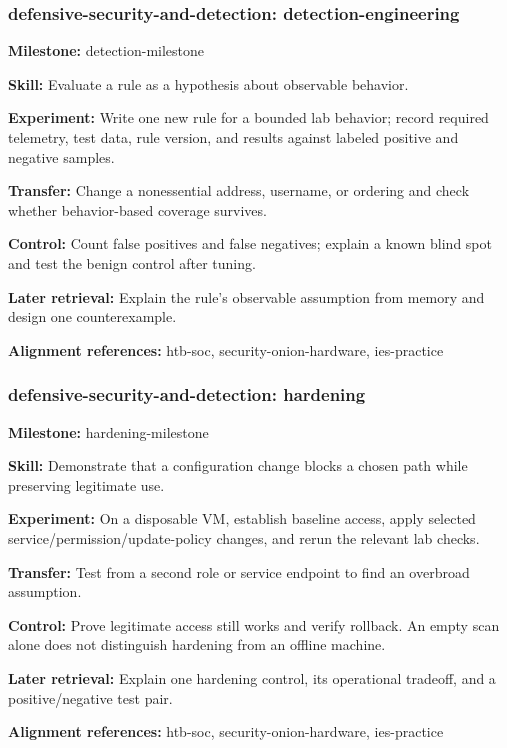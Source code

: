 \subsubsection{defensive-security-and-detection: detection-engineering}
\noindent\textbf{Milestone:} detection-milestone\par
\noindent\textbf{Skill:} Evaluate a rule as a hypothesis about observable behavior.\par
\noindent\textbf{Experiment:} Write one new rule for a bounded lab behavior; record required telemetry, test data, rule version, and results against labeled positive and negative samples.\par
\noindent\textbf{Transfer:} Change a nonessential address, username, or ordering and check whether behavior-based coverage survives.\par
\noindent\textbf{Control:} Count false positives and false negatives; explain a known blind spot and test the benign control after tuning.\par
\noindent\textbf{Later retrieval:} Explain the rule’s observable assumption from memory and design one counterexample.\par
\noindent\textbf{Alignment references:} htb-soc, security-onion-hardware, ies-practice\par
\subsubsection{defensive-security-and-detection: hardening}
\noindent\textbf{Milestone:} hardening-milestone\par
\noindent\textbf{Skill:} Demonstrate that a configuration change blocks a chosen path while preserving legitimate use.\par
\noindent\textbf{Experiment:} On a disposable VM, establish baseline access, apply selected service/permission/update-policy changes, and rerun the relevant lab checks.\par
\noindent\textbf{Transfer:} Test from a second role or service endpoint to find an overbroad assumption.\par
\noindent\textbf{Control:} Prove legitimate access still works and verify rollback. An empty scan alone does not distinguish hardening from an offline machine.\par
\noindent\textbf{Later retrieval:} Explain one hardening control, its operational tradeoff, and a positive/negative test pair.\par
\noindent\textbf{Alignment references:} htb-soc, security-onion-hardware, ies-practice\par
